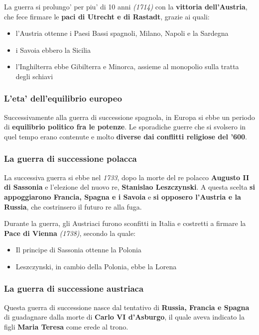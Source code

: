 \documentclass{article}
\begin{document}
{{    La guerra si prolungo' per piu' di 10 anni \textit{(1714)} con la \textbf{vittoria dell'Austria}, che fece firmare le \textbf{paci di Utrecht e di Rastadt}, grazie ai quali:

    \begin{itemize}
      \item l'Austria ottenne i Paesi Bassi spagnoli, Milano, Napoli e la Sardegna
      \item i Savoia ebbero la Sicilia
      \item l'Inghilterra ebbe Gibilterra e Minorca, assieme al monopolio sulla tratta degli schiavi
    \end{itemize}

    \subsubsection{L'eta' dell'equilibrio europeo}
    Successivamente alla guerra di successione spagnola, in Europa si ebbe un periodo di \textbf{equilibrio politico fra le potenze}. Le sporadiche guerre che si svolsero in quel tempo erano contenute e molto \textbf{diverse dai conflitti religiose del '600}.

    \subsubsection{La guerra di successione polacca}
    La successiva guerra si ebbe nel \textit{1733}, dopo la morte del re polacco \textbf{Augusto II di Sassonia} e l'elezione del nuovo re, \textbf{Stanislao Leszczynski}. A questa scelta \textbf{si appoggiarono Francia, Spagna e i Savoia} e \textbf{si opposero l'Austria e la Russia}, che costrinsero il futuro re alla fuga.

    Durante la guerra, gli Austriaci furono sconfitti in Italia e costretti a firmare la \textbf{Pace di Vienna} \textit{(1738)}, secondo la quale:

    \begin{itemize}
      \item Il principe di Sassonia ottenne la Polonia
      \item Leszczynski, in cambio della Polonia, ebbe la Lorena
    \end{itemize}

    \subsubsection{La guerra di successione austriaca}
    Questa guerra di successione nasce dal tentativo di \textbf{Russia, Francia e Spagna} di guadagnare dalla morte di \textbf{Carlo VI d'Asburgo}, il quale aveva indicato la figli \textbf{Maria Teresa} come erede al trono.

}}
\end{document}
